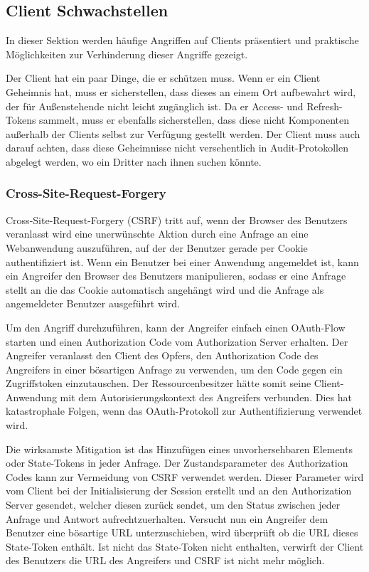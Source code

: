 \subsection{Client Schwachstellen}

In dieser Sektion werden häufige Angriffen auf Clients präsentiert und praktische Möglichkeiten zur Verhinderung dieser Angriffe gezeigt.

Der Client hat ein paar Dinge, die er schützen muss. Wenn er ein Client Geheimnis hat, muss er sicherstellen, dass dieses an einem Ort aufbewahrt wird, der für Außenstehende nicht leicht zugänglich ist. Da er Access- und Refresh-Tokens sammelt, muss er ebenfalls sicherstellen, dass diese nicht Komponenten außerhalb der Clients selbst zur Verfügung gestellt werden. Der Client muss auch darauf achten, dass diese Geheimnisse nicht versehentlich in Audit-Protokollen abgelegt werden, wo ein Dritter nach ihnen suchen könnte.

\subsubsection{Cross-Site-Request-Forgery}


Cross-Site-Request-Forgery (CSRF) tritt auf, wenn der Browser des Benutzers veranlasst wird eine unerwünschte Aktion durch eine Anfrage an eine Webanwendung auszuführen, auf der der Benutzer gerade per Cookie authentifiziert ist. Wenn ein Benutzer bei einer Anwendung angemeldet ist, kann ein Angreifer den Browser des Benutzers manipulieren, sodass er eine Anfrage stellt an die das Cookie automatisch angehängt wird und die Anfrage als angemeldeter Benutzer ausgeführt wird. 

Um den Angriff durchzuführen, kann der Angreifer einfach einen OAuth-Flow starten und einen Authorization Code vom Authorization Server erhalten. Der Angreifer veranlasst den Client des Opfers, den Authorization Code des Angreifers in einer bösartigen Anfrage zu verwenden, um den Code gegen ein Zugriffstoken einzutauschen. Der Ressourcenbesitzer hätte somit seine Client-Anwendung mit dem Autorisierungskontext des Angreifers verbunden. Dies hat katastrophale Folgen, wenn das OAuth-Protokoll zur Authentifizierung verwendet wird. \cite{OAuth2inAction}

Die wirksamste Mitigation ist das Hinzufügen eines unvorhersehbaren Elements oder State-Tokens in jeder Anfrage. Der Zustandsparameter des Authorization Codes kann zur Vermeidung von CSRF verwendet werden. Dieser Parameter wird vom Client bei der Initialisierung der Session erstellt und an den Authorization Server gesendet, welcher diesen zurück sendet, um den Status zwischen jeder Anfrage und Antwort aufrechtzuerhalten. Versucht nun ein Angreifer dem Benutzer eine bösartige URL unterzuschieben, wird überprüft ob die URL dieses State-Token enthält. Ist nicht das State-Token nicht enthalten, verwirft der Client des Benutzers die URL des Angreifers und CSRF ist nicht mehr möglich. \cite{OAuth2inAction}

